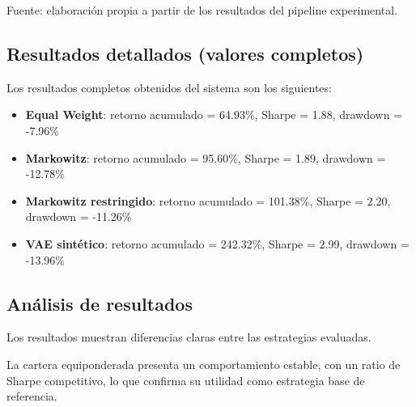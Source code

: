 \begin{table}[h]
\centering
{}
\caption{Comparación de estrategias de inversión fuera de muestra.}
\label{tab:resultados}
\par\small Fuente: elaboración propia a partir de los resultados del pipeline experimental.
\end{table}

\subsection{Resultados detallados (valores completos)}

Los resultados completos obtenidos del sistema son los siguientes:

\begin{itemize}
\item \textbf{Equal Weight}: retorno acumulado = 64.93\%, Sharpe = 1.88, drawdown = -7.96\%
\item \textbf{Markowitz}: retorno acumulado = 95.60\%, Sharpe = 1.89, drawdown = -12.78\%
\item \textbf{Markowitz restringido}: retorno acumulado = 101.38\%, Sharpe = 2.20, drawdown = -11.26\%
\item \textbf{VAE sintético}: retorno acumulado = 242.32\%, Sharpe = 2.99, drawdown = -13.96\%
\end{itemize}

\subsection{Análisis de resultados}

Los resultados muestran diferencias claras entre las estrategias evaluadas.

La cartera equiponderada presenta un comportamiento estable, con un ratio de Sharpe competitivo, lo que confirma su utilidad como estrategia base de referencia.

